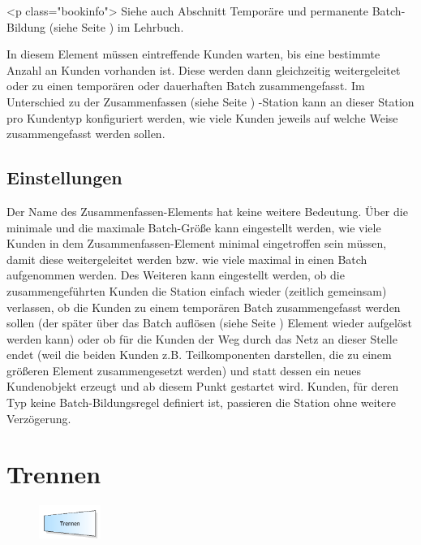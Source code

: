 <p class="bookinfo">
Siehe auch Abschnitt Temporäre und permanente Batch-Bildung (siehe Seite \pageref{ref:book:8.2.5}) im Lehrbuch.

In diesem Element müssen eintreffende Kunden warten, bis eine bestimmte Anzahl an Kunden vorhanden ist.
Diese werden dann gleichzeitig weitergeleitet oder zu einen temporären oder dauerhaften Batch zusammengefasst.
Im Unterschied zu der Zusammenfassen (siehe Seite \pageref{ref:ModelElementBatch}) -Station kann an dieser Station
pro Kundentyp konfiguriert werden, wie viele Kunden jeweils auf welche Weise zusammengefasst werden sollen.

\subsection*{Einstellungen}

Der Name des Zusammenfassen-Elements hat keine weitere Bedeutung. Über die minimale und die maximale Batch-Größe kann
eingestellt werden, wie viele Kunden in dem Zusammenfassen-Element minimal eingetroffen sein müssen, damit diese 
weitergeleitet werden bzw. wie viele maximal in einen Batch aufgenommen werden. Des Weiteren kann eingestellt werden,
ob die zusammengeführten Kunden die Station einfach wieder (zeitlich gemeinsam) verlassen, ob die Kunden zu einem temporären
Batch zusammengefasst werden sollen (der später über das Batch auflösen (siehe Seite \pageref{ref:ModelElementSeparate}) Element
wieder aufgelöst werden kann) oder ob für die Kunden der Weg durch
das Netz an dieser Stelle endet (weil die beiden Kunden z.B. Teilkomponenten darstellen, die zu einem größeren Element
zusammengesetzt werden) und statt dessen ein neues Kundenobjekt erzeugt und ab diesem Punkt gestartet wird.
Kunden, für deren Typ keine Batch-Bildungsregel definiert ist, passieren die Station ohne weitere Verzögerung.


\section{Trennen}
\label{ref:ModelElementSeparate}

\begin{figure}
\vspace{-22pt}
\includegraphics[width=2cm]{imageModelElementSeparate.png}
\vspace{-22pt}
\end{figure}

